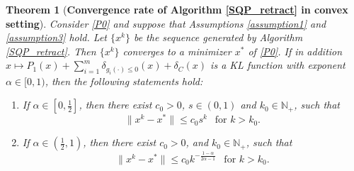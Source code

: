 \documentclass[10pt]{article}
\numberwithin{equation}{section}
\newtheorem{theorem}{Theorem}[section]
\begin{document}
\begin{theorem}[{{\bf Convergence rate of Algorithm \ref{SQP_retract} in convex setting}}]\label{localin}
Consider \eqref{P0} and suppose that Assumptions \ref{assumption1} and \ref{assumption3} hold. Let $\{x^k\}$ be the sequence generated by Algorithm \ref{SQP_retract}. Then $\{x^k\}$ converges to a minimizer $x^*$ of \eqref{P0}. If in addition $x\mapsto P_1(x) + \sum\limits_{i=1}^m\delta_{g_i(\cdot)\leq 0}(x) + \delta_C(x)$ is a KL function with exponent $\alpha\in [0, 1)$, then the following statements hold:
\begin{enumerate}[{\rm (i)}]
   \item If $\alpha\in[0, \frac{1}{2}]$, then there exist $c_0 > 0$, $s\in (0,1)$ and $k_0\in \mathbb{N_+}$, such that
       \[
       \|x^k - x^*\|\leq c_0 s^k ~~\text{  for  } k > k_0.
       \]
   \item If $\alpha\in(\frac{1}{2}, 1)$, then there exist $c_0 > 0$, and $k_0\in \mathbb{N_+}$, such that
       \[
       \|x^k - x^*\|\leq c_0k^{-\frac{1-\alpha}{2\alpha-1}} ~~\text{ for } k > k_0.
       \]
 \end{enumerate}
\end{theorem}
\end{document}
